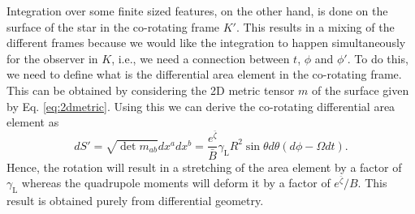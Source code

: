 \documentclass{aa}
\newcommand{\be}{\begin{equation}}
\newcommand{\ee}{\end{equation}}
\newcommand{\refe}[1]{#1}
\newcommand{\Ob}{\ensuremath{\hat{\Omega}}}
\newcommand{\zetab}{\ensuremath{\bar{\zeta}}}
\newcommand{\Bb}{\ensuremath{\bar{B}}}
\newcommand{\lgamma}{\gamma_{\text{L}}}
\begin{document}
Integration over some finite sized features, on the other hand, is done on the surface of the star in the co-rotating frame $K'$.
This results in a mixing of the different frames because we would like the integration to happen simultaneously for the observer in $K$, i.e., we need a connection between $t$, $\phi$ and $\phi'$.
\refe{To do this, we need to define what is the differential area element in the co-rotating frame.}
\refe{This can be obtained by considering the 2D metric tensor $m$ of the surface given by Eq. \eqref{eq:2dmetric}.}
Using this we can \refe{derive} the \refe{co-rotating} differential area element as
\be\label{eq:dSp}
dS' = \sqrt{\det m_{ab}} dx^a dx^b = \frac{e^{\zetab}}{\Bb} \lgamma R^2 \sin\theta d\theta (d\phi - \Omega dt).
\ee
Hence, \refe{the rotation} will result in a stretching of the area element by a factor of $\lgamma$ \refe{whereas the quadrupole moments will deform it by a factor of $e^{\zetab}/B$.}
This result is obtained purely from differential geometry.
\end{document}
